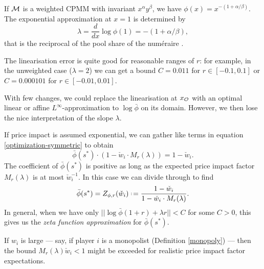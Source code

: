 \begin{example}[CPMM]

  If $\mathcal{M}$ is a weighted CPMM with invariant $x^\alpha y^\beta$, we have $\phi(x)=x^{-(1+\alpha/\beta)}$.
  The exponential approximation at $x=1$ is determined by 
  \[
    \lambda = \frac{d}{dx}\log\phi(1) = -(1+\alpha/\beta),
  \]
  that is the reciprocal of the pool share of the num\'eraire \cite{martinelli2019non}.

  The linearisation error is quite good for reasonable ranges of $r$: for example, in the unweighted case ($\lambda=2$) we can get a bound $C=0.011$ for $r\in[-0.1,0.1]$ or $C=0.000101$ for $r\in[-0.01,0.01]$.
  
\end{example}

\begin{remark}

  With few changes, we could replace the linearisation at $x_{\mathcal{O}}$ with an optimal linear or affine $L^\infty$-approximation to $\log\bar\phi$ on its domain.
  However, we then lose the nice interpretation of the slope $\lambda$.

\end{remark}

If price impact is assumed exponential, we can gather like terms in equation \eqref{optimization-symmetric} to obtain
\[
  \bar\phi({s^*})\cdot\left(1-\check w_i \cdot M_r(\lambda)\right) = 1- \check w_i.
\]
The coefficient of $\bar\phi({s^*})$ is positive as long as the expected price impact factor $M_r(\lambda)$ is at most $\check w_i^{-1}$.
%
In this case we can divide through to find
\begin{equation} \label{exp-manipulation-factor}
  \bar\phi({s^*}) = Z_{\phi,r}(\check w_i) \defeq  \frac{ 1-\check w_i }{ 1-\check w_i\cdot M_r(\lambda) }.
\end{equation}
%
In general, when we have only $||\log\bar\phi(1+r) + \lambda r || < C$ for some $C>0$, this gives us the \emph{zeta function approximation} for $\bar\phi({s^*})$.

\begin{remark}
  
  If $w_i$ is large --- say, if player $i$ is a monopolist (Definition \ref{monopoly}) --- then the bound $M_r(\lambda)\check w_i < 1$ might be exceeded for realistic price impact factor expectations.

\end{remark}

